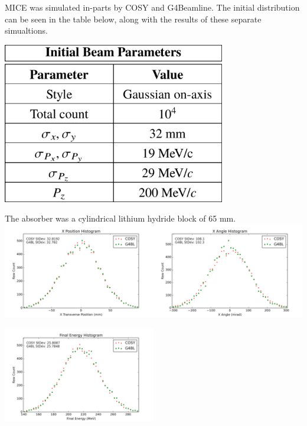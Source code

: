 \documentclass[portrait,a0paper,fontscale=0.285]{baposter} %
\begin{document}
\begin{poster}
{
MICE was simulated in-parts by COSY and G4Beamline. The initial distribution can be seen in the table below, along with the results of these separate simualtions.
\begin{center} \includegraphics[width=0.73\textwidth]{Figures/initial_distribution_table} \end{center}
The absorber was a cylindrical lithium hydride block of 65 mm.\\
\includegraphics[width=0.5\textwidth]{Figures/wedge tests (LiH)/xposition}\includegraphics[width=0.5\textwidth]{Figures/wedge tests (LiH)/xangle}
\begin{center} \includegraphics[width=0.5\textwidth]{Figures/wedge tests (LiH)/energy} \end{center}
}
\end{poster}
\end{document}
